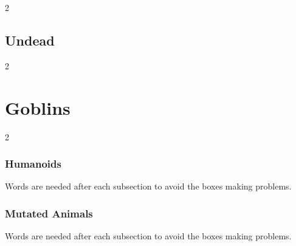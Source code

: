 \documentclass[a4paper,openany]{book}
\begin{document}
\begin{multicols}{2}

\bear

\horse

\warhorse

\boar

\chitincrawler

\basilisk

\wolf

\woodspy

\stirgeSwarm

\crawlerSwarm

\end{multicols}

\section{Undead}

\begin{multicols}{2}

\ghoul

\ghast

\demilich

\lich

\end{multicols}

\chapter{Goblins}

\begin{multicols}{2}

\subsection{Humanoids}
Words are needed after each subsection to avoid the boxes making problems.

\fightAdvert




\goblin

\goblin

\goblincaster

\hobgoblin

\ogre

\subsection{Mutated Animals}
Words are needed after each subsection to avoid the boxes making problems.



\morphrat

\morphhorse

\morphcat

\morphslug

\morphspider

\morphwolf

\morphhuman

\end{multicols}
\end{document}
